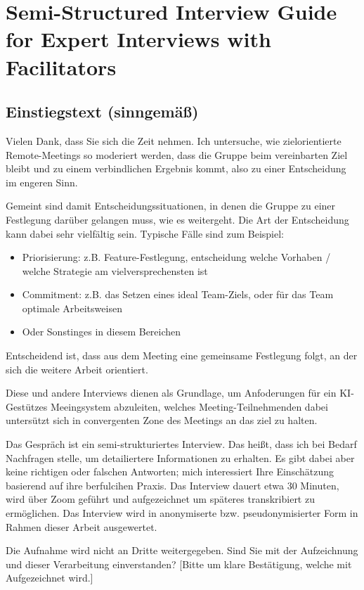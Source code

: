 \section{Semi-Structured Interview Guide for Expert Interviews with Facilitators}
\label{annex:interview-guide-facilitators}

\subsection*{Einstiegstext (sinngemäß)}

Vielen Dank, dass Sie sich die Zeit nehmen. Ich untersuche, wie zielorientierte Remote-Meetings
so moderiert werden, dass die Gruppe beim vereinbarten Ziel bleibt und zu einem
verbindlichen Ergebnis kommt, also zu einer Entscheidung im engeren Sinn.

Gemeint sind damit Entscheidungssituationen, in denen die Gruppe zu einer Festlegung darüber gelangen
muss, wie es weitergeht. Die Art der Entscheidung kann dabei sehr vielfältig sein. Typische Fälle sind
zum Beispiel:
\begin{itemize}
  \item Priorisierung: z.B. Feature-Festlegung, entscheidung welche Vorhaben / welche Strategie am
    vielversprechensten ist
  \item Commitment: z.B. das Setzen eines ideal Team-Ziels, oder für das Team optimale Arbeitsweisen
  \item Oder Sonstinges in diesem Bereichen
\end{itemize}
Entscheidend ist, dass aus dem Meeting eine gemeinsame Festlegung folgt, an der sich die
weitere Arbeit orientiert.

Diese und andere Interviews dienen als Grundlage, um Anfoderungen für ein KI-Gestützes Meeingsystem
abzuleiten, welches Meeting-Teilnehmenden dabei untersützt sich in convergenten Zone des Meetings an das ziel zu halten.

Das Gespräch ist ein semi-strukturiertes Interview. Das heißt, dass ich bei Bedarf Nachfragen stelle, um
detailiertere Informationen zu erhalten.
Es gibt dabei aber keine richtigen oder falschen Antworten; mich interessiert Ihre Einschätzung basierend auf
ihre berfulcihen Praxis.
Das Interview dauert etwa 30 Minuten, wird über Zoom geführt und aufgezeichnet um späteres transkribiert zu
ermöglichen. Das Interview wird in anonymiserte bzw. pseudonymisierter Form in Rahmen dieser Arbeit ausgewertet.

Die Aufnahme wird nicht an Dritte weitergegeben. Sind Sie mit der Aufzeichnung und dieser
Verarbeitung einverstanden? [Bitte um klare Bestätigung, welche mit Aufgezeichnet wird.]

